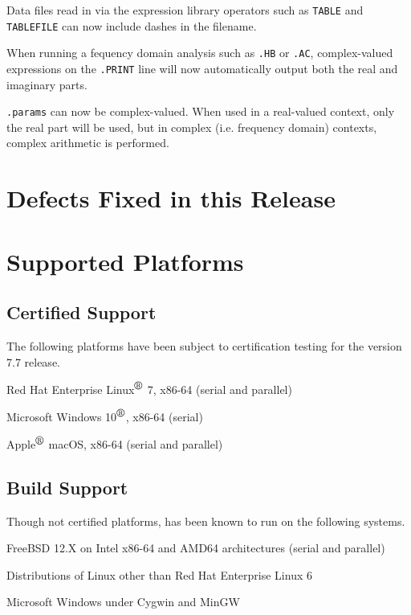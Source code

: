 \documentclass[letterpaper]{scrartcl}
\begin{document}
\begin{XyceItemize}
\item Data files read in via the expression library operators such as
     \texttt{TABLE} and \texttt{TABLEFILE} can now include dashes in the
     filename.

\item When running a fequency domain analysis such as \texttt{.HB} or
     \texttt{.AC}, complex-valued expressions on the \texttt{.PRINT} line will
     now automatically output both the real and imaginary parts.

\item \texttt{.params} can now be complex-valued.  When used in a real-valued
     context, only the real part will be used, but in complex (i.e. frequency
     domain) contexts, complex arithmetic is performed.

\end{XyceItemize}

\newpage
\section{Defects Fixed in this Release}


\newpage
\section{Supported Platforms}
\subsection*{Certified Support}
The following platforms have been subject to certification testing for the
\Xyce{} version 7.7 release.
\begin{XyceItemize}
  \item Red Hat Enterprise Linux${}^{\mbox{\textregistered}}$ 7, x86-64 (serial and parallel)
  \item Microsoft Windows 10${}^{\mbox{\textregistered}}$, x86-64 (serial)
  \item Apple${}^{\mbox{\textregistered}}$ macOS, x86-64 (serial and parallel)
\end{XyceItemize}


\subsection*{Build Support}
Though not certified platforms, \Xyce{} has been known to run on the following
systems.
\begin{XyceItemize}
  \item FreeBSD 12.X on Intel x86-64 and AMD64 architectures (serial
    and parallel)
  \item Distributions of Linux other than Red Hat Enterprise Linux 6
  \item Microsoft Windows under Cygwin and MinGW
\end{XyceItemize}
\end{document}
